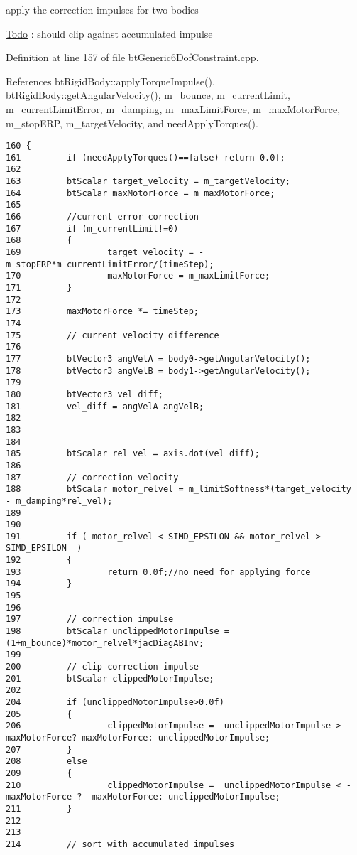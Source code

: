 apply the correction impulses for two bodies 



\begin{Desc}
\item[\hyperlink{todo__todo000028}{Todo}]: should clip against accumulated impulse \end{Desc}


Definition at line 157 of file btGeneric6DofConstraint.cpp.

References btRigidBody::applyTorqueImpulse(), btRigidBody::getAngularVelocity(), m\_\-bounce, m\_\-currentLimit, m\_\-currentLimitError, m\_\-damping, m\_\-maxLimitForce, m\_\-maxMotorForce, m\_\-stopERP, m\_\-targetVelocity, and needApplyTorques().

\begin{Code}\begin{verbatim}160 {
161         if (needApplyTorques()==false) return 0.0f;
162 
163         btScalar target_velocity = m_targetVelocity;
164         btScalar maxMotorForce = m_maxMotorForce;
165 
166         //current error correction
167         if (m_currentLimit!=0)
168         {
169                 target_velocity = -m_stopERP*m_currentLimitError/(timeStep);
170                 maxMotorForce = m_maxLimitForce;
171         }
172 
173         maxMotorForce *= timeStep;
174 
175         // current velocity difference
176 
177         btVector3 angVelA = body0->getAngularVelocity();
178         btVector3 angVelB = body1->getAngularVelocity();
179 
180         btVector3 vel_diff;
181         vel_diff = angVelA-angVelB;
182 
183 
184 
185         btScalar rel_vel = axis.dot(vel_diff);
186 
187         // correction velocity
188         btScalar motor_relvel = m_limitSoftness*(target_velocity  - m_damping*rel_vel);
189 
190 
191         if ( motor_relvel < SIMD_EPSILON && motor_relvel > -SIMD_EPSILON  )
192         {
193                 return 0.0f;//no need for applying force
194         }
195 
196 
197         // correction impulse
198         btScalar unclippedMotorImpulse = (1+m_bounce)*motor_relvel*jacDiagABInv;
199 
200         // clip correction impulse
201         btScalar clippedMotorImpulse;
202 
204         if (unclippedMotorImpulse>0.0f)
205         {
206                 clippedMotorImpulse =  unclippedMotorImpulse > maxMotorForce? maxMotorForce: unclippedMotorImpulse;
207         }
208         else
209         {
210                 clippedMotorImpulse =  unclippedMotorImpulse < -maxMotorForce ? -maxMotorForce: unclippedMotorImpulse;
211         }
212 
213 
214         // sort with accumulated impulses

\end{verbatim}
\end{Code}
